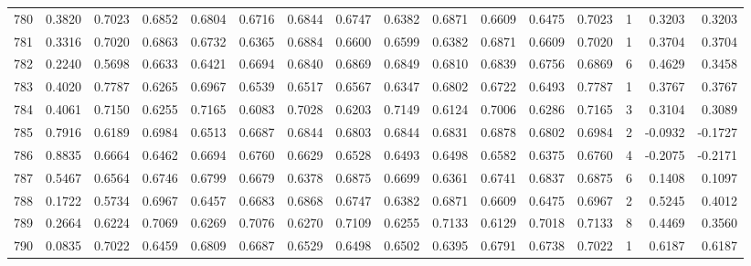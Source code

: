 \begin{tabular}{lrrrrrrrrrrrrrrr}
780 &      0.3820 &  0.7023 &  0.6852 &  0.6804 &  0.6716 &  0.6844 &  0.6747 &  0.6382 &  0.6871 &  0.6609 &   0.6475 &     0.7023 &      1 &                    0.3203 &                     0.3203 \\
781 &      0.3316 &  0.7020 &  0.6863 &  0.6732 &  0.6365 &  0.6884 &  0.6600 &  0.6599 &  0.6382 &  0.6871 &   0.6609 &     0.7020 &      1 &                    0.3704 &                     0.3704 \\
782 &      0.2240 &  0.5698 &  0.6633 &  0.6421 &  0.6694 &  0.6840 &  0.6869 &  0.6849 &  0.6810 &  0.6839 &   0.6756 &     0.6869 &      6 &                    0.4629 &                     0.3458 \\
783 &      0.4020 &  0.7787 &  0.6265 &  0.6967 &  0.6539 &  0.6517 &  0.6567 &  0.6347 &  0.6802 &  0.6722 &   0.6493 &     0.7787 &      1 &                    0.3767 &                     0.3767 \\
784 &      0.4061 &  0.7150 &  0.6255 &  0.7165 &  0.6083 &  0.7028 &  0.6203 &  0.7149 &  0.6124 &  0.7006 &   0.6286 &     0.7165 &      3 &                    0.3104 &                     0.3089 \\
785 &      0.7916 &  0.6189 &  0.6984 &  0.6513 &  0.6687 &  0.6844 &  0.6803 &  0.6844 &  0.6831 &  0.6878 &   0.6802 &     0.6984 &      2 &                   -0.0932 &                    -0.1727 \\
786 &      0.8835 &  0.6664 &  0.6462 &  0.6694 &  0.6760 &  0.6629 &  0.6528 &  0.6493 &  0.6498 &  0.6582 &   0.6375 &     0.6760 &      4 &                   -0.2075 &                    -0.2171 \\
787 &      0.5467 &  0.6564 &  0.6746 &  0.6799 &  0.6679 &  0.6378 &  0.6875 &  0.6699 &  0.6361 &  0.6741 &   0.6837 &     0.6875 &      6 &                    0.1408 &                     0.1097 \\
788 &      0.1722 &  0.5734 &  0.6967 &  0.6457 &  0.6683 &  0.6868 &  0.6747 &  0.6382 &  0.6871 &  0.6609 &   0.6475 &     0.6967 &      2 &                    0.5245 &                     0.4012 \\
789 &      0.2664 &  0.6224 &  0.7069 &  0.6269 &  0.7076 &  0.6270 &  0.7109 &  0.6255 &  0.7133 &  0.6129 &   0.7018 &     0.7133 &      8 &                    0.4469 &                     0.3560 \\
790 &      0.0835 &  0.7022 &  0.6459 &  0.6809 &  0.6687 &  0.6529 &  0.6498 &  0.6502 &  0.6395 &  0.6791 &   0.6738 &     0.7022 &      1 &                    0.6187 &                     0.6187 \\

\end{tabular}
